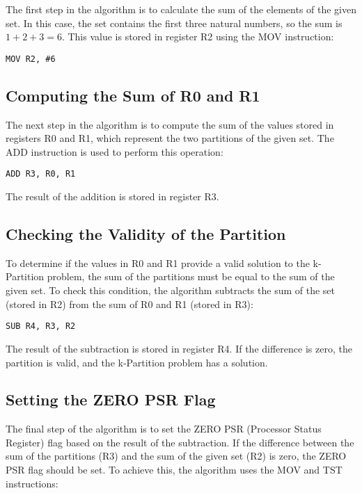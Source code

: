 \begin{enumerate}
The first step in the algorithm is to calculate the sum of the elements of the given set. In this case, the set contains the first three natural numbers, so the sum is $1 + 2 + 3 = 6$. This value is stored in register R2 using the MOV instruction:

\begin{verbatim}
MOV R2, #6
\end{verbatim}

\subsection{Computing the Sum of R0 and R1}

The next step in the algorithm is to compute the sum of the values stored in registers R0 and R1, which represent the two partitions of the given set. The ADD instruction is used to perform this operation:

\begin{verbatim}
ADD R3, R0, R1
\end{verbatim}

The result of the addition is stored in register R3.

\subsection{Checking the Validity of the Partition}

To determine if the values in R0 and R1 provide a valid solution to the k-Partition problem, the sum of the partitions must be equal to the sum of the given set. To check this condition, the algorithm subtracts the sum of the set (stored in R2) from the sum of R0 and R1 (stored in R3):

\begin{verbatim}
SUB R4, R3, R2
\end{verbatim}

The result of the subtraction is stored in register R4. If the difference is zero, the partition is valid, and the k-Partition problem has a solution.

\subsection{Setting the ZERO PSR Flag}

The final step of the algorithm is to set the ZERO PSR (Processor Status Register) flag based on the result of the subtraction. If the difference between the sum of the partitions (R3) and the sum of the given set (R2) is zero, the ZERO PSR flag should be set. To achieve this, the algorithm uses the MOV and TST instructions:


\end{enumerate}
